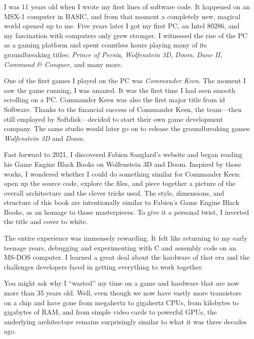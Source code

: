 \documentclass[book.tex]{subfiles}
\begin{document}
I was 11 years old when I wrote my first lines of software code. It happened on an MSX-1 computer in BASIC, and from that moment a completely new, magical world opened up to me. Five years later I got my first PC, an Intel 80286, and my fascination with computers only grew stronger. I witnessed the rise of the PC as a gaming platform and spent countless hours playing many of its groundbreaking titles: \textit{Prince of Persia}, \textit{Wolfenstein 3D}, \textit{Doom}, \textit{Dune II}, \textit{Command \& Conquer}, and many more.\\

\par
One of the first games I played on the PC was \textit{Commander Keen}. The moment I saw the game running, I was amazed. It was the first time I had seen smooth scrolling on a PC. Commander Keen was also the first major title from id Software. Thanks to the financial success of Commander Keen, the team---then still employed by Softdisk---decided to start their own game development company. The same studio would later go on to release the groundbreaking games \textit{Wolfenstein 3D} and \textit{Doom}.\\

\par
Fast forward to 2021, I discovered Fabien Sanglard’s website and began reading his Game Engine Black Books on Wolfenstein 3D and Doom. Inspired by those works, I wondered whether I could do something similar for Commander Keen: open up the source code, explore the files, and piece together a picture of the overall architecture and the clever tricks used. The style, dimensions, and structure of this book are intentionally similar to Fabien’s Game Engine Black Books, as an homage to those masterpieces. To give it a personal twist, I inverted the title and cover to white.\\

\par
The entire experience was immensely rewarding. It felt like returning to my early teenage years, debugging and experimenting with C and assembly code on an MS-DOS computer. I learned a great deal about the hardware of that era and the challenges developers faced in getting everything to work together.\\

\par
You might ask why I “wasted” my time on a game and hardware that are now more than 35 years old. Well, even though we now have vastly more transistors on a chip and have gone from megahertz to gigahertz CPUs, from kilobytes to gigabytes of RAM, and from simple video cards to powerful GPUs, the underlying architecture remains surprisingly similar to what it was three decades ago.\\
\end{document}
